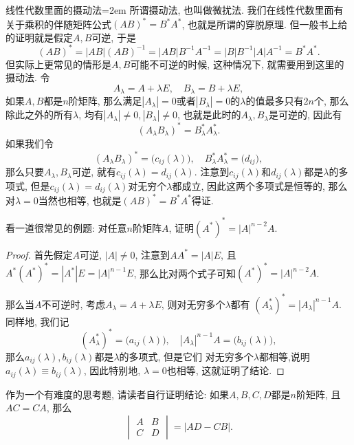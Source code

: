 \documentclass[UTF8,no-math,12pt,openany,table,dvipsnames,svgnames]{book}
\begin{document}
\begin{MYBOX}[colbacktitle=blue]{线性代数里面的摄动法}\parindent=2em
所谓摄动法, 也叫做微扰法. 我们在线性代数里面有关于乘积的伴随矩阵公式$(AB)^\ast=B^\ast A^\ast$, 也就是所谓的穿脱原理. 但一般书上给的证明就是假定$A,B$可逆, 于是
\[ (AB)^\ast=|AB|(AB)^{-1}=|AB|B^{-1}A^{-1}=|B|B^{-1}|A|A^{-1}=B^\ast A^\ast. \]
但实际上更常见的情形是$A,B$可能不可逆的时候, 这种情况下, 就需要用到这里的摄动法. 令
\[ A_\lambda=A+\lambda E,\quad B_\lambda=B+\lambda E,\]
如果$A,B$都是$n$阶矩阵, 那么满足$|A_\lambda|=0$或者$|B_\lambda|=0$的$\lambda$的值最多只有$2n$个, 那么除此之外的所有$\lambda$, 均有$|A_\lambda|\ne0,|B_\lambda|\ne0$, 也就是此时的$A_\lambda,B_\lambda$是可逆的, 因此有
  \[(A_\lambda B_\lambda)^\ast=B_\lambda^\ast A_\lambda^\ast.\]
如果我们令
 \[  (A_\lambda B_\lambda)^\ast=\big(c_{ij}(\lambda)\big),\quad B_\lambda^\ast A_\lambda^\ast =
 \big(d_{ij}\big), \]
那么只要$A_\lambda,B_\lambda$可逆, 就有$c_{ij}(\lambda)=d_{ij}(\lambda)$. 注意到$c_{ij}(\lambda)$和$d_{ij}(\lambda)$都是$\lambda$的多项式, 但是$c_{ij}(\lambda)=d_{ij}(\lambda)$对无穷个$\lambda$都成立, 因此这两个多项式是恒等的, 那么对$\lambda=0$当然也相等, 也就是$(AB)^\ast=B^\ast A^\ast$得证.

看一道很常见的例题: 对任意$n$阶矩阵$A$, 证明$(A^\ast)^\ast=|A|^{n-2}A$.
\begin{proof}
  首先假定$A$可逆, $|A|\ne0$, 注意到$AA^\ast=|A|E$, 且$A^\ast(A^\ast)^\ast=|A^\ast|E=|A|^{n-1}E$, 那么比对两个式子可知$(A^\ast)^\ast=|A|^{n-2}A$.

  那么当$A$不可逆时, 考虑$A_\lambda=A+\lambda E$, 则对无穷多个$\lambda$都有 $(A_\lambda^\ast)^\ast=|A_\lambda|^{n-1}A$. 同样地, 我们记
  \[ (A_\lambda^\ast)^\ast=\big(a_{ij}(\lambda)\big),\quad |A_\lambda|^{n-1}A=\big(b_{ij}(\lambda)\big), \]
  那么$a_{ij}(\lambda),b_{ij}(\lambda)$都是$\lambda$的多项式, 但是它们 对无穷多个$\lambda$都相等,说明$a_{ij}(\lambda)\equiv b_{ij}(\lambda)$, 因此特别地, $\lambda=0$也相等, 这就证明了结论.
\end{proof}
 作为一个有难度的思考题, 请读者自行证明结论: 如果$A,B,C,D$都是$n$阶矩阵, 且$AC=CA$, 那么
  \[ \begin{vmatrix}
    A & B \\ C & D
  \end{vmatrix}=|AD-CB|. \]
\end{MYBOX}
\end{document}
